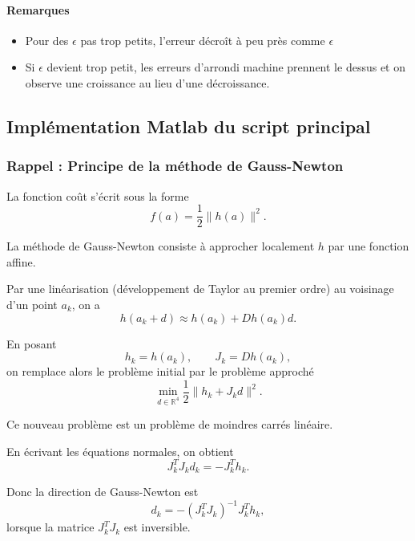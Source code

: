 \documentclass[a4paper,12pt]{article}
\begin{document}
	\paragraph{Remarques}
	\begin{itemize}
		\item[$\bullet$] Pour des $\epsilon$ pas trop petits, l’erreur décroît à peu près comme $\epsilon$
		\item[$\bullet$] Si $\epsilon$ devient trop petit, les erreurs d’arrondi machine prennent le dessus et on observe une croissance au lieu d'une décroissance.
	\end{itemize}
	
	\subsection{Implémentation Matlab du script principal}
	
	\subsubsection{Rappel : Principe de la méthode de Gauss-Newton}
	
	La fonction coût s'écrit sous la forme
	\[
	f(a)=\frac12\|h(a)\|^2.
	\]
	
	La méthode de Gauss-Newton \cite{bjorck1996,nocedal2006} consiste à approcher localement $h$ par une fonction affine.
	
	Par une linéarisation (développement de Taylor au premier ordre) au voisinage d'un point $a_k$, on a
	\begin{equation}
	h(a_k+d)\approx h(a_k)+Dh(a_k)d.
	\end{equation}
	
	En posant
	\[
	h_k=h(a_k), \qquad J_k=Dh(a_k),
	\]
	on remplace alors le problème initial par le problème approché
	\begin{equation}
	\min_{d\in\mathbb{R}^4}\frac12\|h_k+J_kd\|^2.
	\end{equation}
	
	Ce nouveau problème est un problème de moindres carrés linéaire.
	
	En écrivant les équations normales, on obtient
	\begin{equation}
	J_k^T J_k d_k = -J_k^T h_k.
	\end{equation}
	
	Donc la direction de Gauss-Newton est
	\begin{equation}
	d_k=-(J_k^T J_k)^{-1}J_k^T h_k,
	\end{equation}
	lorsque la matrice $J_k^TJ_k$ est inversible.
	
\end{document}
